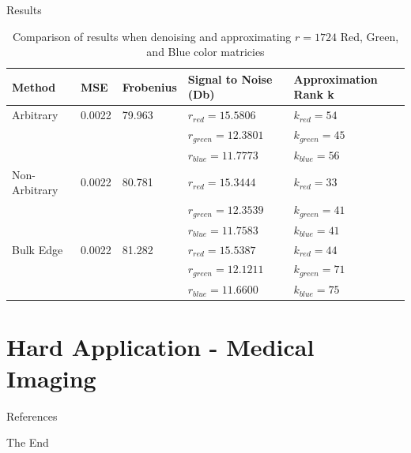 \documentclass[aspectratio=169,xcolor=dvipsnames]{beamer}
\begin{document}
	\begin{frame}{Results}
		\begin{table}
			\begin{tabular}{l | l | l | l |l}
				\toprule
				\textbf{Method} & \textbf{MSE} & \textbf{Frobenius} & \textbf{Signal to Noise (Db)} & \textbf{Approximation Rank k} \\
				\midrule
				Arbitrary          & 0.0022           & 79.963 &  $r_{red} = 15.5806$ &  $k_{red} = 54$ \\
				& & & $r_{green} = 12.3801$ & $k_{green} = 45$ \\
				& & & $r_{blue} = 11.7773$ & $k_{blue} = 56$\\\hline
				Non-Arbitrary         & 0.0022            & 80.781 & $r_{red} = 15.3444$ & $k_{red} = 33$             \\
				& & & $r_{green} = 12.3539$ & $k_{green} = 41$\\
				& & & $r_{blue} = 11.7583$ & $k_{blue} = 41$\\\hline
				Bulk Edge       & 0.0022            & 81.282 & $r_{red} = 15.5387$ &      $k_{red} = 44$         \\
				& & & $r_{green} = 12.1211$ & $k_{green} = 71$\\
				& & & $r_{blue} = 11.6600$  & $k_{blue} = 75$\\
				\bottomrule
			\end{tabular}
			\caption{Comparison of results when denoising and approximating $r = 1724$ Red, Green, and Blue color matricies}
		\end{table}
	\end{frame}
	
	\section{Hard Application - Medical Imaging}
	
	\begin{frame}{References}
		\printbibliography
	\end{frame}
	
	
	\begin{frame}
		\Huge{\centerline{The End}}
	\end{frame}
	
	
\end{document}
